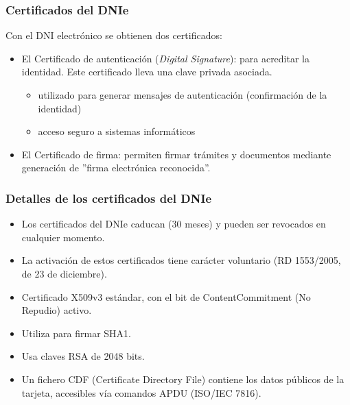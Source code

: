 \documentclass{beamer}
\begin{document}

\begin{frame}
\frametitle{Certificados del DNIe}

Con el DNI electrónico se obtienen dos certificados:

\begin{itemize}
\item El \alert{Certificado de autenticación} (\textit{Digital Signature}): para acreditar la identidad. Este certificado lleva una clave privada asociada.
	\begin{itemize}
	\item utilizado para generar mensajes de autenticación (confirmación de la identidad)
	\item acceso seguro a sistemas informáticos
	\end{itemize}
\item El \alert{Certificado de firma}: permiten firmar trámites y documentos mediante generación de ''firma electrónica reconocida''.
\end{itemize}

\end{frame}


\begin{frame}
\frametitle{Detalles de los certificados del DNIe}

\begin{itemize}
\item Los certificados del DNIe caducan (30 meses) y pueden ser revocados en cualquier momento.
\item La activación de estos certificados tiene \alert{carácter voluntario} (RD 1553/2005, de 23 de diciembre).
\item Certificado X509v3 estándar, con el bit de ContentCommitment (No Repudio) activo.
\item Utiliza para firmar SHA1.
\item Usa claves RSA de 2048 bits.
\item Un fichero CDF (Certificate Directory File) contiene los datos públicos de la tarjeta, accesibles vía comandos APDU (ISO/IEC 7816).
\end{itemize}

\end{frame}


\end{document}
